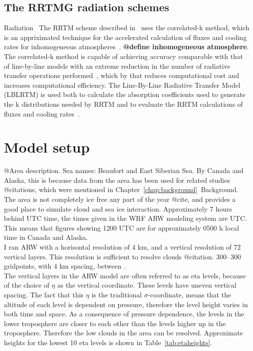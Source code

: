 \subsection{The RRTMG radiation schemes}
Radiation~\citep{Mlawer1997}
The RRTM scheme described in~\citet{Mlawer1997} uses the correlated-k method, which is an appriximated technique for the accelerated calculation of fluxes and cooling rates for inhomogeneous atmospheres~\citep{Mlawer1997}. \textbf{@define inhomogeneous atmosphere}.
The correlated-k method is capable of achieving accuracy comparable with that of line-by-line models with an extreme reduction in the number of radiative transfer operations performed~\citep{Mlawer1997}, which by that reduces computational cost and increases computational efficiency. The Line-By-Line Radiative Transfer Model (LBLRTM) is used both to calculate the absorption coefficients used to generate the k distributions needed by RRTM and  to evaluate the RRTM calculations of fluxes and cooling rates~\citep{Iacono2000}. 


\section{Model setup}
\label{sec:modelsetup}
@Area description. Sea names: Beaufort and East Siberian Sea. By Canada and Alaska, this is because data from the area has been used for related studies @citations, which were mentioned in Chapter~\ref{chap:background}~Background.%
The area is not completely ice free any part of the year @cite, and provides a good place to simulate cloud and sea ice interaction. Approximately 7 hours behind UTC time, the times given in the WRF ARW modeling system are UTC. This means that figures showing 1200 UTC are for approximately 0500 h local time in Canada and Alaska.
\\
I ran ARW with a horisontal resolution of 4 km, and a vertical resolution of 72 vertical layers. This resolution is sufficient to resolve clouds @citation. 300$\cdot$ 300 gridpoints, with 4 km spacing, between .
\\
The vertical layers in the ARW model are often referred to as eta levels, because of the choice of $\eta$ as the vertical coordinate. These levels have uneven vertical spacing. The fact that this $\eta$ is the traditional $\sigma$-coordinate, means that the altitude of each level is dependent on pressure, therefore the level height varies in both time and space. As a consequence of pressure dependence, the levels in the lower troposphere are closer to each other than the levels higher up in the troposphere. Therefore the low clouds in the area can be resolved. Approximate heights for the lowest 10 eta levels is shown in Table~\ref{tab:etaheights}.


